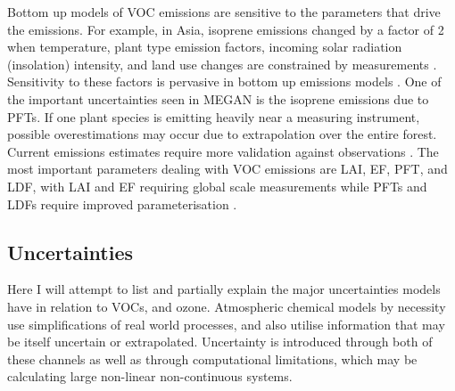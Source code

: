     Bottom up models of VOC emissions are sensitive to the parameters that drive the emissions.
    For example, in Asia, isoprene emissions changed by a factor of 2 when temperature, plant type emission factors, incoming solar radiation (insolation) intensity, and land use changes are constrained by measurements \parencite{Stavrakou2014}.
    Sensitivity to these factors is pervasive in bottom up emissions models \parencite[eg.][]{Marais2014,Miller2014,Messina2016}.
    One of the important uncertainties seen in MEGAN is the isoprene emissions due to PFTs.
    If one plant species is emitting heavily near a measuring instrument, possible overestimations may occur due to extrapolation over the entire forest.
    Current emissions estimates require more validation against observations \parencite{Messina2016}.
    The most important parameters dealing with VOC emissions are LAI, EF, PFT, and LDF, with LAI and EF requiring global scale measurements while PFTs and LDFs require improved parameterisation \parencite{Messina2016}.
    
    
  \subsection{Uncertainties}
  \label{LR:Models:Uncert}
    
    Here I will attempt to list and partially explain the major uncertainties models have in relation to  VOCs, and ozone.
    Atmospheric chemical models by necessity use simplifications of real world processes, and also utilise information that may be itself uncertain or extrapolated.
    Uncertainty is introduced through both of these channels as well as through computational limitations, which may be calculating large non-linear non-continuous systems.
    
